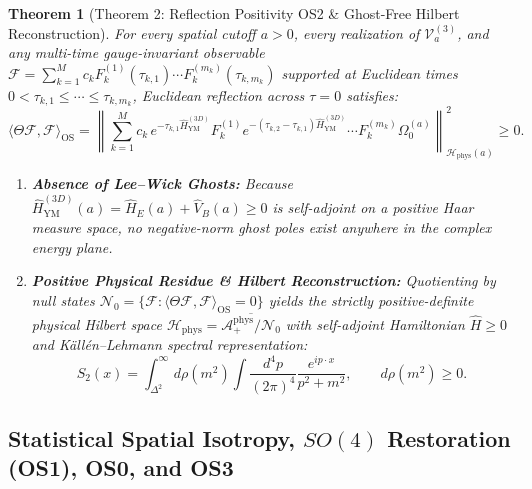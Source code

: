 \documentclass[11pt, a4paper]{article}
\newtheorem{theorem}{Theorem}[section]
\theoremstyle{definition}
\theoremstyle{remark}
\begin{document}
\begin{theorem}[Theorem 2: Reflection Positivity OS2 \& Ghost-Free Hilbert Reconstruction]
\label{thm:theorem2}
For every spatial cutoff $a > 0$, every realization of $\mathcal{V}_{a}^{(3)}$, and any multi-time gauge-invariant observable $\mathcal{F} = \sum_{k=1}^{M} c_{k} F_{k}^{(1)}(\tau_{k,1})\cdots F_{k}^{(m_{k})}(\tau_{k, m_{k}})$ supported at Euclidean times $0 < \tau_{k,1} \le \cdots \le \tau_{k, m_{k}}$, Euclidean reflection across $\tau = 0$ satisfies:
\begin{equation}
  \langle \Theta\mathcal{F}, \mathcal{F} \rangle_{\mathrm{OS}} = \left\| \sum_{k=1}^{M} c_{k}\,e^{-\tau_{k,1}\hat{H}_{\mathrm{YM}}^{(3D)}} F_{k}^{(1)} e^{-(\tau_{k,2}-\tau_{k,1})\hat{H}_{\mathrm{YM}}^{(3D)}}\cdots F_{k}^{(m_{k})}\Omega_{0}^{(a)} \right\|_{\mathcal{H}_{\mathrm{phys}}(a)}^{2} \ge 0.
\end{equation}
\begin{enumerate}
  \item \textbf{Absence of Lee--Wick Ghosts:} Because $\hat{H}_{\mathrm{YM}}^{(3D)}(a) = \hat{H}_{E}(a) + \hat{V}_{B}(a) \ge 0$ is self-adjoint on a positive Haar measure space, no negative-norm ghost poles exist anywhere in the complex energy plane.
  \item \textbf{Positive Physical Residue \& Hilbert Reconstruction:} Quotienting by null states $\mathcal{N}_{0} = \{\mathcal{F} : \langle \Theta\mathcal{F}, \mathcal{F} \rangle_{\mathrm{OS}} = 0\}$ yields the strictly positive-definite physical Hilbert space $\mathcal{H}_{\mathrm{phys}} = \overline{\mathcal{A}_{+}^{\mathrm{phys}}/\mathcal{N}_{0}}$ with self-adjoint Hamiltonian $\hat{H} \ge 0$ and K\"all\'en--Lehmann spectral representation:
  \begin{equation}
    S_{2}(x) = \int_{\Delta^{2}}^{\infty} d\rho(m^{2}) \int \frac{d^{4}p}{(2\pi)^{4}} \frac{e^{ip\cdot x}}{p^{2} + m^{2}}, \qquad d\rho(m^{2}) \ge 0.
  \end{equation}
\end{enumerate}
\end{theorem}

\subsection{Statistical Spatial Isotropy, $SO(4)$ Restoration (OS1), OS0, and OS3}
\end{document}
